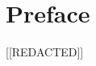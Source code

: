 
\chapter*{Preface}


\vspace*{\fill}

\begin{center}
    [[REDACTED]]
\end{center}

\vspace*{\fill}

\newpage
